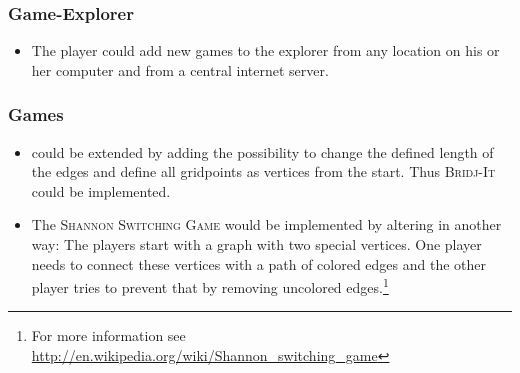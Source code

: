\subsubsection{Game-Explorer}
\begin{itemize}

	\item The player could add new games to the explorer from any location on his or her computer and from a central internet server.

\end{itemize}

\subsubsection{Games}
\begin{itemize}
	\item {\twixt} could be extended by adding the possibility to change the defined length of the edges and define all gridpoints as vertices from the start. Thus \textsc{Bridj-It} could be implemented.
	\item The \textsc{Shannon Switching Game} would be implemented by altering {\twixt} in another way: The players start with a graph with two special vertices. One player needs to connect these vertices with a path of colored edges and the other player tries to prevent that by removing uncolored edges.\footnote{For more information see \url{http://en.wikipedia.org/wiki/Shannon_switching_game}}
\end{itemize}